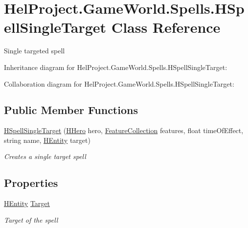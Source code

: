 \hypertarget{class_hel_project_1_1_game_world_1_1_spells_1_1_h_spell_single_target}{}\section{Hel\+Project.\+Game\+World.\+Spells.\+H\+Spell\+Single\+Target Class Reference}
\label{class_hel_project_1_1_game_world_1_1_spells_1_1_h_spell_single_target}


Single targeted spell  




Inheritance diagram for Hel\+Project.\+Game\+World.\+Spells.\+H\+Spell\+Single\+Target\+:


Collaboration diagram for Hel\+Project.\+Game\+World.\+Spells.\+H\+Spell\+Single\+Target\+:
\subsection*{Public Member Functions}
\begin{DoxyCompactItemize}
\item 
\hyperlink{class_hel_project_1_1_game_world_1_1_spells_1_1_h_spell_single_target_ac17216b17a63c040afc7dae6a14f420a}{H\+Spell\+Single\+Target} (\hyperlink{class_hel_project_1_1_game_world_1_1_entities_1_1_h_hero}{H\+Hero} hero, \hyperlink{class_hel_project_1_1_features_1_1_feature_collection}{Feature\+Collection} features, float time\+Of\+Effect, string name, \hyperlink{class_hel_project_1_1_game_world_1_1_entities_1_1_h_entity}{H\+Entity} target)
\begin{DoxyCompactList}\small\item\em Creates a single target spell \end{DoxyCompactList}\end{DoxyCompactItemize}
\subsection*{Properties}
\begin{DoxyCompactItemize}
\item 
\hyperlink{class_hel_project_1_1_game_world_1_1_entities_1_1_h_entity}{H\+Entity} \hyperlink{class_hel_project_1_1_game_world_1_1_spells_1_1_h_spell_single_target_addb117babce01c6786178be3d38c3222}{Target}
\begin{DoxyCompactList}\small\item\em Target of the spell \end{DoxyCompactList}\end{DoxyCompactItemize}


